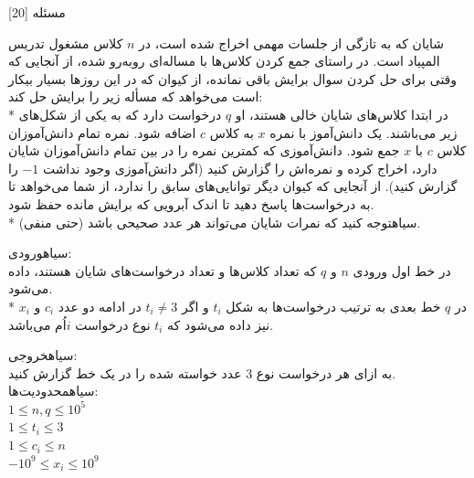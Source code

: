 ‌مسئله [20]

شایان که به تازگی از جلسات مهمی اخراج شده است، در $n$ کلاس مشغول تدریس المپیاد است. در راستای جمع کردن کلاس‌ها با مساله‌ای روبه‌رو شده، از آنجایی که وقتی برای حل کردن سوال برایش باقی نمانده، از کیوان که در این روزها بسیار بیکار است می‌خواهد که مسأله زیر را برایش حل کند:\\*
در ابتدا کلاس‌های شایان خالی هستند، او $q$ درخواست دارد که به یکی از شکل‌های زیر می‌باشند.
 یک دانش‌آموز با نمره $x$ به کلاس $c$ اضافه شود. 
 نمره تمام دانش‌آموزان کلاس $c$ با $x$ جمع شود.
 دانش‌آموزی که کمترین نمره را در بین تمام دانش‌آموزان شایان دارد، اخراج کرده و نمره‌اش را گزارش کنید (اگر دانش‌آموزی وجود نداشت $-1$ را گزارش کنید).
از آنجایی که کیوان دیگر توانایی‌های سابق را ندارد، از شما می‌خواهد تا به درخواست‌ها پاسخ دهید تا اندک آبرویی که برایش مانده حفظ شود.\\*
‌سیاه{توجه کنید که نمرات شایان می‌تواند هر عدد صحیحی باشد (حتی منفی).}

\noindent
{}‌سیاه{ورودی:}\\
در خط اول ورودی $n$ و $q$ که تعداد کلاس‌ها و تعداد درخواست‌های شایان هستند، داده می‌شود.\\*
در $q$ خط بعدی به ترتیب درخواست‌ها به شکل $t_i$ و اگر $t_i \neq 3$ در ادامه دو عدد $c_i$ و $x_i$ نیز داده می‌شود که $t_i$ نوع درخواست $i$اُم می‌باشد.

\noindent
{}‌سیاه{خروجی:}\\
به ازای هر درخواست نوع $3$ عدد خواسته شده را در یک خط گزارش کنید.\\
‌سیاه{محدودیت‌ها:}\\
$1\leq n,q\leq 10^5$\\
$1\leq t_i\leq 3$\\
$1\leq c_i\leq n$\\
$-10^9\leq x_i\leq 10^9$



